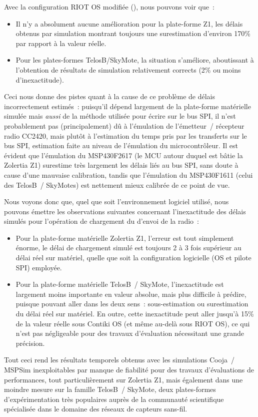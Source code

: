 Avec la configuration RIOT OS modifiée (), nous
pouvons voir que~:

\begin{itemize}

\item Il n'y a absolument aucune amélioration pour la plate-forme Z1,
les délais obtenus par simulation montrant toujours une surestimation
d'environ 170\% par rapport à la valeur réelle.

\item Pour les plates-formes TelosB/SkyMote, la situation s'améliore,
aboutissant à l'obtention de résultats de simulation relativement
corrects (2\% ou moins d'inexactitude).

\end{itemize}

Ceci nous donne des pistes quant à la cause de ce problème de délais
incorrectement estimés~: puisqu'il dépend largement de la plate-forme
matérielle simulée mais \emph{aussi} de la méthode utilisée pour
écrire sur le bus SPI, il n'est probablement pas (principalement)
dû à l'émulation de l'émetteur~/ récepteur radio CC2420, mais plutôt
à l'estimation du temps pris par les transferts sur le bus SPI,
estimation faite au niveau de l'émulation du microcontrôleur.
Il est évident que l'émulation du MSP430F2617 (le MCU autour
duquel est bâtie la Zolertia Z1) surestime très largement les délais
liés au bus SPI, sans doute à cause d'une mauvaise calibration,
tandis que l'émulation du MSP430F1611 (celui des TelosB~/ SkyMotes)
est nettement mieux calibrée de ce point de vue.

\bigskip

Nous voyons donc que, quel que soit l'environnement logiciel utilisé,
nous pouvons émettre les observations suivantes concernant l'inexactitude
des délais simulés pour l'opération de chargement du  d'envoi
de la radio~:
\begin{itemize}
\item Pour la plate-forme matérielle Zolertia Z1, l'erreur est
tout simplement énorme, le délai de chargement simulé est toujours
2 à 3 fois supérieur au délai réel sur matériel, quelle que soit la
configuration logicielle (OS et pilote SPI) employée.
\item Pour la plate-forme matérielle TelosB~/ SkyMote, l'inexactitude
est largement moins importante en valeur absolue, mais plus difficile
à prédire, puisque pouvant aller dans les deux sens~: sous-estimation
ou surestimation du délai réel sur matériel. En outre, cette inexactitude
peut aller jusqu'à 15\% de la valeur réelle sous Contiki OS (et même
au-delà sous RIOT OS), ce qui n'est pas négligeable pour des travaux
d'évaluation nécessitant une grande précision.
\end{itemize}
Tout ceci rend les résultats temporels obtenus avec les simulations
Cooja~/ MSPSim inexploitables par manque de fiabilité pour des travaux
d'évaluations de performances, tout particulièrement sur Zolertia Z1,
mais également dans une moindre mesure sur la famille TelosB~/ SkyMote,
deux plates-formes d'expérimentation très populaires auprès de la
communauté scientifique spécialisée dans le domaine des réseaux
de capteurs sans-fil.

